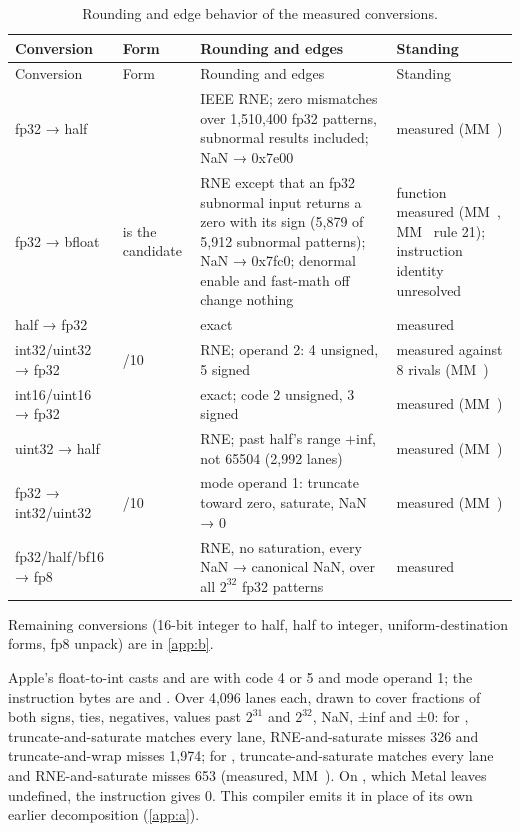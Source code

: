\begin{xltabular}{\linewidth}{@{}>{\hsize}XX>{\hsize}X>{\hsize}X@{}}
\caption{Rounding and edge behavior of the measured conversions.}\label{tab:conversions}\\
\toprule
Conversion & Form & Rounding and edges & Standing \\
\midrule
\endfirsthead
{}
\toprule
Conversion & Form & Rounding and edges & Standing \\
\midrule
\endhead
fp32 → half &  & IEEE RNE; zero mismatches over 1,510,400 fp32 patterns, subnormal
results included; NaN → 0x7e00 & measured (MM~) \\*
fp32 → bfloat &  is the candidate & RNE except that an fp32 subnormal input returns a zero with its sign
(5,879 of 5,912 subnormal patterns); NaN → 0x7fc0;
denormal enable and fast-math off change nothing & function measured (MM~, MM~ rule 21); instruction identity
unresolved \\*
half → fp32 &  & exact & measured \\*
int32/uint32 → fp32 & /10 & RNE; operand 2: 4 unsigned, 5 signed & measured against 8 rivals (MM~) \\*
int16/uint16 → fp32 &  & exact; code 2 unsigned, 3 signed & measured (MM~) \\*
uint32 → half &  & RNE; past half's range +inf, not 65504 (2,992
lanes) & measured (MM~) \\*
fp32 → int32/uint32 & /10 & mode operand 1: truncate toward zero, saturate, NaN → 0 & measured (MM~) \\*
fp32/half/bf16 → fp8 &  & RNE, no saturation, every NaN → canonical NaN, over all
$2^{32}$ fp32 patterns & measured \\*
\bottomrule
\end{xltabular}

Remaining conversions (16-bit integer to half, half to integer, uniform-destination forms, fp8 unpack) are in \cref{app:b}.

Apple's float-to-int casts  and  are  with code 4 or 5 and mode
operand 1; the instruction bytes are  and . Over 4,096 lanes each, drawn to
cover fractions of both signs, ties, negatives, values past $2^{31}$ and $2^{32}$, NaN, ±inf and ±0: for ,
truncate-and-saturate matches every lane, RNE-and-saturate misses 326 and truncate-and-wrap misses 1,974; for ,
truncate-and-saturate matches every lane and RNE-and-saturate misses 653 (measured, MM~). On , which
Metal leaves undefined, the instruction gives 0. This compiler emits it in place of its own earlier decomposition
(\cref{app:a}).

